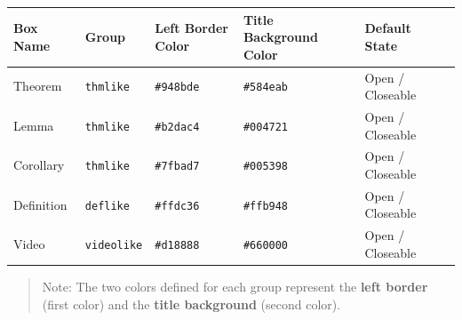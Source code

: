 \documentclass[
  a4paper,
  DIV=11,
  numbers=noendperiod,
  oneside]{scrreport}
\begin{document}
\begin{longtable}[]{@{}
  >{\raggedright\arraybackslash}p{}
  >{\raggedright\arraybackslash}p{}
  >{\raggedright\arraybackslash}p{}
  >{\raggedright\arraybackslash}p{}
  >{\raggedright\arraybackslash}p{}
  >{\raggedright\arraybackslash}p{}@{}}
\toprule\noalign{}
\begin{minipage}[b]{\linewidth}\raggedright
Box Name
\end{minipage} & \begin{minipage}[b]{\linewidth}\raggedright
Group
\end{minipage} & \begin{minipage}[b]{\linewidth}\raggedright
Left Border Color
\end{minipage} & \begin{minipage}[b]{\linewidth}\raggedright
Title Background Color
\end{minipage} & \begin{minipage}[b]{\linewidth}\raggedright
Default State
\end{minipage} & \begin{minipage}[b]{\linewidth}\raggedright
\end{minipage} \\
\midrule\noalign{}
\endhead
\bottomrule\noalign{}
\endlastfoot
Theorem & \texttt{thmlike} & \texttt{\#948bde} & \texttt{\#584eab} &
Open / Closeable & \\
Lemma & \texttt{thmlike} & \texttt{\#b2dac4} & \texttt{\#004721} & Open
/ Closeable & \\
Corollary & \texttt{thmlike} & \texttt{\#7fbad7} & \texttt{\#005398} &
Open / Closeable & \\
Definition & \texttt{deflike} & \texttt{\#ffdc36} & \texttt{\#ffb948} &
Open / Closeable & \\
Video & \texttt{videolike} & \texttt{\#d18888} & \texttt{\#660000} &
Open / Closeable & \\
\end{longtable}

\begin{quote}
Note: The two colors defined for each group represent the \textbf{left
border} (first color) and the \textbf{title background} (second color).
\end{quote}
\end{document}

